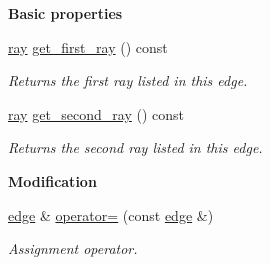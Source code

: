 \begin{Indent}\textbf{ Basic properties}\par
\begin{DoxyCompactItemize}
\item 
\mbox{\label{classedge_a7c35e5555bd71f1e9f6231216b8c882e}} 
\hyperlink{classray}{ray} \hyperlink{classedge_a7c35e5555bd71f1e9f6231216b8c882e}{get\+\_\+first\+\_\+ray} () const
\begin{DoxyCompactList}\small\item\em Returns the first ray listed in this edge. \end{DoxyCompactList}\item 
\mbox{\label{classedge_a2baca8d9ca7f40edfb9364df3ec4c4a8}} 
\hyperlink{classray}{ray} \hyperlink{classedge_a2baca8d9ca7f40edfb9364df3ec4c4a8}{get\+\_\+second\+\_\+ray} () const
\begin{DoxyCompactList}\small\item\em Returns the second ray listed in this edge. \end{DoxyCompactList}\end{DoxyCompactItemize}
\end{Indent}
\begin{Indent}\textbf{ Modification}\par
\begin{DoxyCompactItemize}
\item 
\mbox{\label{classedge_acd5e308a604773f2d414732b6a873032}} 
\hyperlink{classedge}{edge} \& \hyperlink{classedge_acd5e308a604773f2d414732b6a873032}{operator=} (const \hyperlink{classedge}{edge} \&)
\begin{DoxyCompactList}\small\item\em Assignment operator. \end{DoxyCompactList}\end{DoxyCompactItemize}
\end{Indent}
